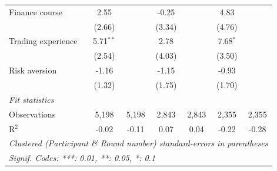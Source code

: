 \begin{table}[htbp]
\begin{tabular}{lcccccc}
      Finance course                       & 2.55          &               & -0.25         &               & 4.83          &   \\   
                                           & (2.66)        &               & (3.34)        &               & (4.76)        &   \\   
      Trading experience                   & 5.71$^{**}$   &               & 2.78          &               & 7.68$^{*}$    &   \\   
                                           & (2.54)        &               & (4.03)        &               & (3.50)        &   \\   
      Risk aversion                        & -1.16         &               & -1.15         &               & -0.93         &   \\   
                                           & (1.32)        &               & (1.75)        &               & (1.70)        &   \\   
      \midrule
      \emph{Fit statistics}\\
      Observations                         & 5,198         & 5,198         & 2,843         & 2,843         & 2,355         & 2,355\\  
      R$^2$                                & -0.02         & -0.11         & 0.07          & 0.04          & -0.22         & -0.28\\  
      \midrule \midrule
      \multicolumn{7}{l}{\emph{Clustered (Participant \& Round number) standard-errors in parentheses}}\\
      \multicolumn{7}{l}{\emph{Signif. Codes: ***: 0.01, **: 0.05, *: 0.1}}\\
   \end{tabular}
\end{table}

